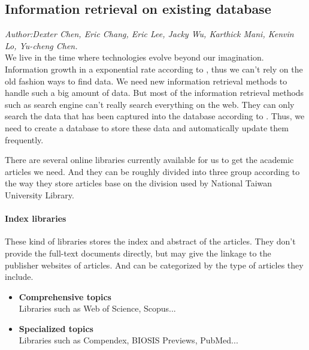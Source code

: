 	
\subsection{Information retrieval on existing database}
\textit{\footnotesize Author:Dexter Chen, Eric Chang, Eric Lee, Jacky Wu, Karthick Mani, Kenvin Lo, Yu-cheng Chen.}\\

We live in the time where technologies evolve beyond our imagination. Information growth in a exponential rate according to \cite{Tague1981}, thus we can't rely on the old fashion ways to find data. We need new information retrieval methods to handle such a big amount of data. But most of the information retrieval methods such as search engine can't really search everything on the web. They can only search the data that has been captured into the database according to \cite{Grehan2002}. Thus, we need to create a database to store these data and automatically update them frequently.

There are several online libraries currently available for us to get the academic articles we need. And they can be roughly divided into three group according to the way they store articles base on the division used by National Taiwan University Library.

\paragraph{Index libraries}
	These kind of libraries stores the index and abstract of the articles. They don't provide the full-text documents directly, but may give the linkage to the publisher websites of articles. And can be categorized by the type of articles they include.
	\begin{itemize}
		\item\textbf{Comprehensive topics}\\Libraries such as Web of Science, Scopus...
		\item\textbf{Specialized topics}\\Libraries such as Compendex, BIOSIS Previews, PubMed...
	\end{itemize}
	
